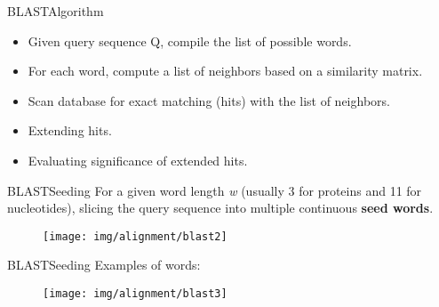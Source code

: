 \documentclass[10pt]{beamer}
\newcommand{\1}{
	\setbeamertemplate{background}{
		\texttt{[image: img/1]}
		\tikz[overlay] \fill[fill opacity=0.75,fill=white] (0,0) rectangle (-\paperwidth,\paperheight);
	}
}
\begin{document}
\begin{frame}{BLAST}{Algorithm}
	\begin{block}{}
		\begin{itemize}
			\item Given query sequence Q, compile the list of possible words.
			\item For each word, compute a list of neighbors based on a similarity matrix.
			\item Scan database for exact matching (hits) with the list of neighbors. 
			\item Extending hits. 
			\item Evaluating significance of extended hits.
		\end{itemize}
		
		
	\end{block}
\end{frame}

\begin{frame}{BLAST}{Seeding}
	For a given word length \textit{w} (usually 3 for proteins and 11 for nucleotides), slicing the query sequence into multiple continuous \textbf{seed words}.
	
		\begin{figure}[]
		\centering
		\texttt{[image: img/alignment/blast2]}
	\end{figure}
\end{frame}

\begin{frame}{BLAST}{Seeding}
	Examples of words:
	\begin{figure}[]
		\centering
		\texttt{[image: img/alignment/blast3]}
	\end{figure}
\end{frame}
\end{document}
